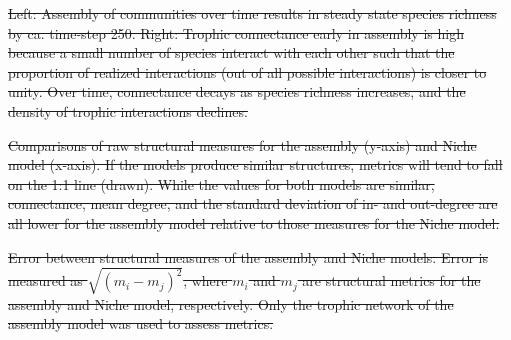 \documentclass[twocolumn,preprintnumbers,amsmath,amssymb,superscriptaddress,linenumbers]{revtex4-1}
\providecommand{\DIFdel}[1]{{\protect\color{red}\sout{#1}}}                      %
\providecommand{\DIFdelFL}[1]{\DIFdel{#1}} %
\begin{document}


{%
\DIFdelFL{Left: Assembly of communities over time results in steady state species richness by ca. time-step 250.
Right: Trophic connectance early in assembly is high because a small number of species interact with each other such that the proportion of realized interactions (out of all possible interactions) is closer to unity.
Over time, connectance decays as species richness increases, and the density of trophic interactions declines.
}}

{%
\DIFdelFL{Comparisons of raw structural measures for the assembly (y-axis) and Niche model (x-axis).
If the models produce similar structures, metrics will tend to fall on the 1:1 line (drawn).
While the values for both models are similar, connectance, mean degree, and the standard deviation of in- and out-degree are all lower for the assembly model relative to those measures for the Niche model.
}}

{%
\DIFdelFL{Error between structural measures of the assembly and Niche models.
Error is measured as $\sqrt{(m_i - m_j)^2}$, where $m_i$ and $m_j$ are structural metrics for the assembly and Niche model, respectively.
Only the trophic network of the assembly model was used to assess metrics.
}}
\end{document}
